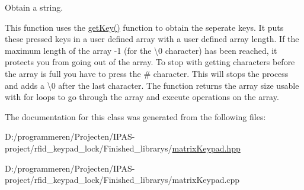 Obtain a string. 

This function uses the \hyperlink{classmatrix_keypad_adb0562ac12409dd390afe759297d7a95}{get\+Key()} function to obtain the seperate keys. It puts these pressed keys in a user defined array with a user defined array length. If the maximum length of the array -\/1 (for the \textquotesingle{}\textbackslash{}0\textquotesingle{} character) has been reached, it protects you from going out of the array. To stop with getting characters before the array is full you have to press the \textquotesingle{}\#\textquotesingle{} character. This will stops the process and adds a \textquotesingle{}\textbackslash{}0\textquotesingle{} after the last character. The function returns the array size usable with for loops to go through the array and execute operations on the array. 

The documentation for this class was generated from the following files\+:\begin{DoxyCompactItemize}
\item 
D\+:/programmeren/\+Projecten/\+I\+P\+A\+S-\/project/rfid\+\_\+keypad\+\_\+lock/\+Finished\+\_\+librarys/\hyperlink{matrix_keypad_8hpp}{matrix\+Keypad.\+hpp}\item 
D\+:/programmeren/\+Projecten/\+I\+P\+A\+S-\/project/rfid\+\_\+keypad\+\_\+lock/\+Finished\+\_\+librarys/matrix\+Keypad.\+cpp\end{DoxyCompactItemize}

